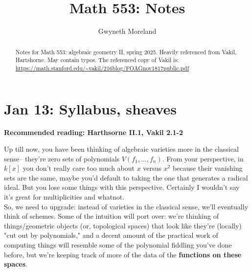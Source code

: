 \documentclass[10pt,reqno]{amsart}
\theoremstyle{definition}
\theoremstyle{remark}
\numberwithin{equation}{section}
\numberwithin{theorem}{section}
\begin{document}
\title{Math 553: Notes}

\author[Moreland]{Gwyneth Moreland}
\address{Department of Mathematics, Stat., \& CS, University of Illinois Chicago, Chicago, IL 60607}

\begin{abstract}
Notes for Math 553: algebraic geometry II, spring 2025. Heavily referenced from Vakil, Hartshorne. May contain typos. The referenced copy of Vakil is: \\ \url{https://math.stanford.edu/~vakil/216blog/FOAGnov1817public.pdf}
\end{abstract}
\maketitle

\tableofcontents
\section{Jan 13: Syllabus, sheaves}

\textbf{Recommended reading: Harthsorne II.1, Vakil 2.1-2}

Up till now, you have been thinking of algebraic varieties more in the classical sense-- they're zero sets of polynomials $V(f_1,\dots,f_n)$. From your perspective, in $k[x]$ you don't really care too much about $x$ versus $x^2$ because their vanishing sets are the same, maybe you'd default to taking the one that generates a radical ideal. But you lose some things with this perspective. Certainly I wouldn't say it's great for multiplicities and whatnot.
\\

So, we need to upgrade: instead of varieties in the classical sense, we'll eventually think of schemes. Some of the intuition will port over: we're thinking of things/geometric objects (or, topological spaces) that look like they're (locally) "cut out by polynomials," and a decent amount of the practical work of computing things will resemble some of the polynomial fiddling you've done before, but we're keeping track of more of the data of the \textbf{functions on these spaces}.
\\
\end{document}
